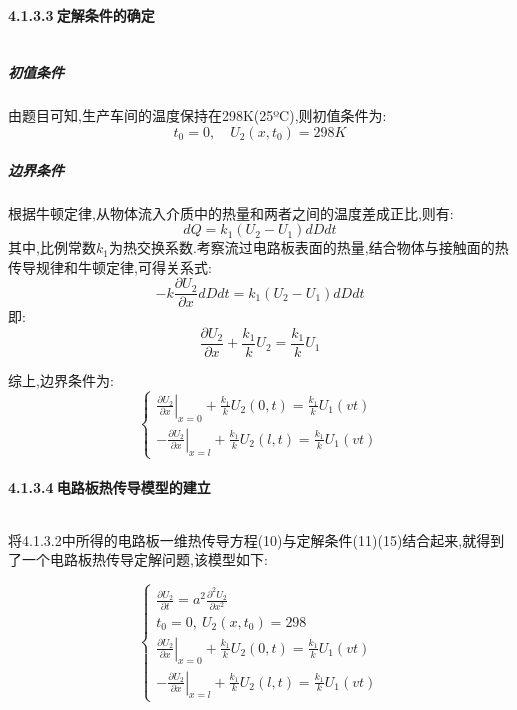 \documentclass[12pt]{ctexart}
\numberwithin{figure}{section}
\numberwithin{table}{section}
\begin{document}
\paragraph{4.1.3.3$\ $定解条件的确定}$\ $
\subparagraph{初值条件}
由题目可知,生产车间的温度保持在298K(25ºC),则初值条件为\cite{3}:
\begin{equation}
  t_0=0,\quad  U_2(x,t_0)=298K
\end{equation}
\subparagraph{边界条件}
根据牛顿定律,从物体流入介质中的热量和两者之间的温度差成正比,则有:
\begin{equation}
dQ=k_1(U_2-U_1)dDdt
\end{equation}
其中,比例常数$k_1$为热交换系数.考察流过电路板表面的热量,结合物体与接触面的热传导规律和牛顿定律,可得关系式:
\begin{equation}
-k\frac{\partial U_2}{\partial x}dDdt=k_1(U_2-U_1)dDdt
\end{equation}
即:
\begin{equation}
\frac{\partial U_2}{\partial x}+\frac{k_1}{k}U_2=\frac{k_1}{k}U_1
\end{equation}

综上,边界条件为:
\begin{equation}
\left\{
\begin{array}{cc}
   \left.\frac{\partial U_2}{\partial x}\right|_{x=0}+\frac{k_1}{k}U_2(0,t)=\frac{k_1}{k}U_1(vt)\\ 
  -\left.\frac{\partial U_2}{\partial x}\right|_{x=l}+\frac{k_1}{k}U_2(l,t)=\frac{k_1}{k}U_1(vt)
\end{array}\right.
\end{equation}

\paragraph{4.1.3.4$\ $电路板热传导模型的建立}$\ $

将4.1.3.2中所得的电路板一维热传导方程(10)与定解条件(11)(15)结合起来,就得到了一个电路板热传导定解问题,该模型如下:

\begin{equation}
\left\{
\begin{array}{cc}
  \frac{\partial U_2}{\partial t}=a^2\frac{\partial^2 U_2}{\partial x^2}\\
  t_0=0,\ U_2(x,t_0)=298\\
  \left.\frac{\partial U_2}{\partial x}\right|_{x=0}+\frac{k_1}{k}U_2(0,t)=\frac{k_1}{k}U_1(vt)\\
  -\left.\frac{\partial U_2}{\partial x}\right|_{x=l}+\frac{k_1}{k}U_2(l,t)=\frac{k_1}{k}U_1(vt)
\end{array}\right. 
\end{equation}
\end{document}
